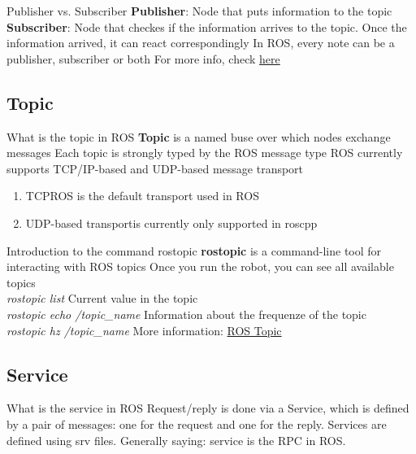 \documentclass{beamer}
\begin{document}
\begin{frame}{Publisher vs. Subscriber}
\textbf{Publisher}: Node that puts information to the topic
\vfill
\textbf{Subscriber}: Node that checkes if the information arrives to the topic. Once the information arrived, it can react correspondingly
\vfill
In ROS, every note can be a publisher, subscriber or both
\vfill
For more info, check \href{http://wiki.ros.org/ROS/Tutorials/WritingPublisherSubscriber\%28python\%29}{here}
\end{frame}

\subsection{Topic}
\begin{frame}{What is the topic in ROS}
\textbf{Topic} is a named buse over which nodes exchange messages
\vfill
Each topic is strongly typed by the ROS message type
\vfill
ROS currently supports TCP/IP-based and UDP-based message transport
\begin{enumerate}
\item TCPROS is the default transport used in ROS 
\item UDP-based transportis currently only supported in roscpp
\end{enumerate}
\end{frame}

\begin{frame}{Introduction to the command rostopic}
\textbf{rostopic} is a command-line tool for interacting with ROS topics
\vfill
Once you run the robot, you can see all available topics\\
\textit{rostopic list}
\vfill
Current value in the topic\\
\textit{rostopic echo /topic\_name}
\vfill
Information about the frequenze of the topic\\
\textit{rostopic hz /topic\_name}
\vfill
More information: \href{http://wiki.ros.org/rostopic}{ROS Topic}
\end{frame}

\subsection{Service}
\begin{frame}{What is the service in ROS}
Request/reply is done via a Service, which is defined by a pair of messages: one for the request and one for the reply.
\vfill
Services are defined using srv files.
\vfill
Generally saying: service is the RPC in ROS.
\end{frame}
\end{document}
